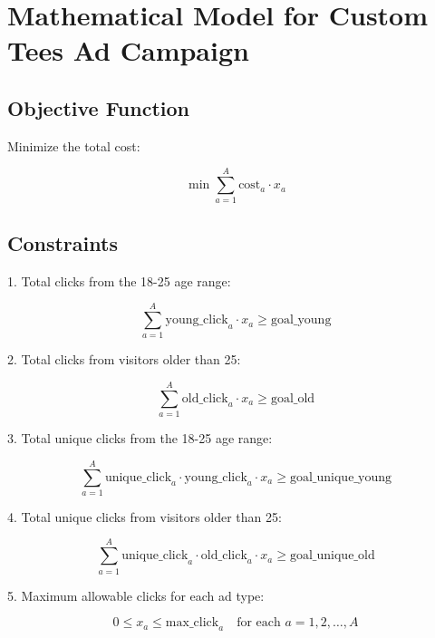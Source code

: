 \documentclass{article}
\begin{document}
\section*{Mathematical Model for Custom Tees Ad Campaign}

\subsection*{Objective Function}
Minimize the total cost:

\[
\min \sum_{a=1}^{A} \text{cost}_a \cdot x_a
\]

\subsection*{Constraints}

1. Total clicks from the 18-25 age range:

\[
\sum_{a=1}^{A} \text{young\_click}_a \cdot x_a \geq \text{goal\_young}
\]

2. Total clicks from visitors older than 25:

\[
\sum_{a=1}^{A} \text{old\_click}_a \cdot x_a \geq \text{goal\_old}
\]

3. Total unique clicks from the 18-25 age range:

\[
\sum_{a=1}^{A} \text{unique\_click}_a \cdot \text{young\_click}_a \cdot x_a \geq \text{goal\_unique\_young}
\]

4. Total unique clicks from visitors older than 25:

\[
\sum_{a=1}^{A} \text{unique\_click}_a \cdot \text{old\_click}_a \cdot x_a \geq \text{goal\_unique\_old}
\]

5. Maximum allowable clicks for each ad type:

\[
0 \leq x_a \leq \text{max\_click}_a \quad \text{for each } a = 1, 2, \ldots, A
\]
\end{document}
